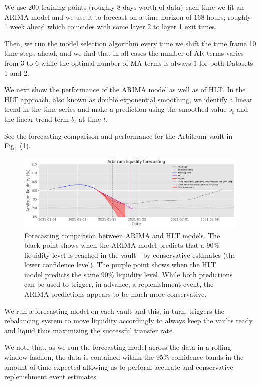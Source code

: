 We use $200$ training points (roughly 8 days worth of data) each time we fit an ARIMA model and we use it to forecast on a time horizon of $168$ hours; roughly 1 week ahead which coincides with some layer 2 to layer 1 exit times.

Then, we run the model selection algorithm every time we shift the time frame 10 time steps ahead, and we find that in all cases the number of AR terms varies from $3$ to $6$ while the optimal number of MA terms is always $1$ for both Datasets 1 and 2.

We next show the performance of the ARIMA model as well as of HLT. In the HLT approach, also known as double exponential smoothing, we identify a linear trend in the time series and make a prediction using the smoothed value $s_t$ and the linear trend term $b_t$ at time $t$.

See the forecasting comparison and performance for the Arbitrum vault in Fig.~(\ref{fig:arb_conserv}).

\begin{figure}[h]
    \centering
    \includegraphics[width=\textwidth]{images/arbitrum_instance_t_fin270_90perce_drop.png}
    \caption{Forecasting comparison between ARIMA and HLT models. The black point shows when the ARIMA model predicts that a 90\% liquidity level is reached in the vault - by conservative estimates (the lower confidence level). The purple point shows when the HLT model predicts the same 90\% liquidity level. While both predictions can be used to trigger, in advance, a replenishment event, the ARIMA predictions appears to be much more conservative.}
    \label{fig:arb_conserv}
\end{figure}

We run a forecasting model on each vault and this, in turn, triggers the rebalancing system to move liquidity accordingly to always keep the vaults ready and liquid thus maximizing the successful transfer rate.

We note that, as we run the forecasting model across the data in a rolling window fashion, the data is contained within the 95\% confidence bands in the amount of time expected allowing us to perform accurate and conservative replenishment event estimates.

